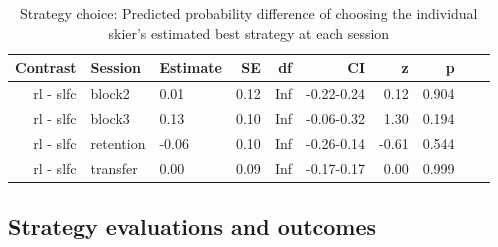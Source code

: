 \documentclass[pdflatex,sn-nature]{sn-jnl}%
\theoremstyle{thmstyleone}%
\theoremstyle{thmstyletwo}%
\theoremstyle{thmstylethree}%
\begin{document}
\begin{appendices}
\begin{table}[p]
\caption{Strategy choice: Predicted probability difference of choosing the individual skier's estimated best strategy at each session}\label{table_strategychoice_estimatedbest_groupdiff}
\centering
\begin{tabular}{rllrrrrrrl}
  \hline
 Contrast & Session & Estimate & SE & df & CI & z & p \\ 
  \hline
 rl - slfc & block2 & 0.01 & 0.12 & Inf & -0.22-0.24 & 0.12 &    0.904 \\ 
   rl - slfc & block3 & 0.13 & 0.10 & Inf & -0.06-0.32 & 1.30 &    0.194 \\ 
   rl - slfc & retention & -0.06 & 0.10 & Inf & -0.26-0.14 & -0.61 &    0.544 \\ 
  rl - slfc & transfer & 0.00 & 0.09 & Inf & -0.17-0.17 & 0.00 &    0.999 \\ 
   \hline
\end{tabular}
\end{table}


\subsection{Strategy evaluations and outcomes}


\end{appendices}
\end{document}
